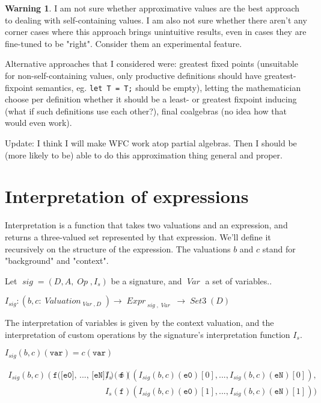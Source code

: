 \documentclass[oneside,12pt]{book}
\theoremstyle{definition}
\newtheorem*{warning}{Warning}
\theoremstyle{remark}
\newcommand\var[1]{\mathop{\mathit{#1}}\nolimits}
\newcommand{\sig}{\var{sig}}
\newcommand{\Op}{\var{Op}}
\newcommand{\Var}{\var{Var}}
\newcommand{\SetIII}{\var{Set3}}
\newcommand{\Valuation}{\var{Valuation}}
\newcommand{\Expr}{\var{Expr}}
\begin{document}
\begin{warning}
  I am not sure whether approximative values are the best approach to dealing
  with self-containing values. I am also not sure whether there aren't any
  corner cases where this approach brings unintuitive results, even in cases
  they are fine-tuned to be "right". Consider them an experimental feature.
  
  Alternative approaches that I considered were: greatest fixed points (unsuitable
  for non-self-containing values, only productive definitions should have
  greatest-fixpoint semantics, eg. \texttt{let T = T;} should be empty), letting
  the mathematician choose per definition whether it should be a least- or greatest
  fixpoint inducing (what if such definitions use each other?), final coalgebras
  (no idea how that would even work).
  
  Update: I think I will make WFC work atop partial algebras. Then I should be (more
  likely to be) able to do this approximation thing general and proper.
\end{warning}


\section{Interpretation of expressions}
Interpretation is a function that takes two valuations and an expression, and
returns a three-valued set represented by that expression. We'll define it
recursively on the structure of the expression. The valuations $b$ and $c$ stand
for "background" and "context".

\begin{defBox}
  Let $\sig = (D, A, \Op, I_s)$ be a signature, and $\Var$ a set of variables..
  
  \bigskip \noindent
  $I_{\sig}\colon (b, c \colon \Valuation_{\Var,D}) \to \Expr_{\sig,\Var} \to \SetIII(D)$
\end{defBox}

The interpretation of variables is given by the context valuation,
and the interpretation of custom operations by the signature's interpretation
function $I_s$.

\begin{defBox}
  $I_{\sig}(b,c)(\texttt{var}) = c(\texttt{var})$
  
  \medskip \noindent $\begin{aligned}
    I_{\sig}(b,c)(\texttt{f([e0], ..., [eN])}) =
      (&I_s(\texttt{f})
        (I_{\sig}(b,c)(\texttt{e0})[0], ..., I_{\sig}(b,c)(\texttt{eN})[0]), \\
      &I_s(\texttt{f})
        (I_{\sig}(b,c)(\texttt{e0})[1], ..., I_{\sig}(b,c)(\texttt{eN})[1]))
    \end{aligned}$
\end{defBox}
\end{document}
